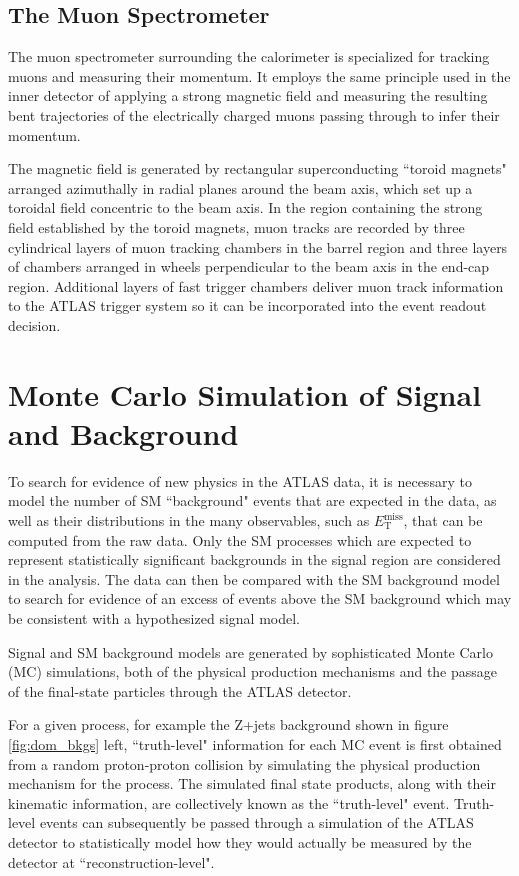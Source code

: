 \documentclass[12pt]{article}
\newcommand*{\met}{\ensuremath{E_\text{T}^\text{miss}}}
\begin{document}
\subsection{The Muon Spectrometer}

The muon spectrometer \cite{atlas} surrounding the calorimeter is specialized for tracking muons and measuring their momentum. It employs the same principle used in the inner detector of applying a strong magnetic field and measuring the resulting bent trajectories of the electrically charged muons passing through to infer their momentum. 

The magnetic field is generated by rectangular superconducting ``toroid magnets" arranged azimuthally in radial planes around the beam axis, which set up a toroidal field concentric to the beam axis. In the region containing the strong field established by the toroid magnets, muon tracks are recorded by three cylindrical layers of muon tracking chambers in the barrel region and three layers of chambers arranged in wheels perpendicular to the beam axis in the end-cap region. Additional layers of fast trigger chambers deliver muon track information to the ATLAS trigger system so it can be incorporated into the event readout decision. 

\newpage

\section{Monte Carlo Simulation of Signal and Background}

To search for evidence of new physics in the ATLAS data, it is necessary to model the number of SM ``background" events that are expected in the data, as well as their distributions in the many observables, such as \met, that can be computed from the raw data. Only the SM processes which are expected to represent statistically significant backgrounds in the signal region are considered in the analysis. The data can then be compared with the SM background model to search for evidence of an excess of events above the SM background which may be consistent with a hypothesized signal model.

Signal and SM background models are generated by sophisticated Monte Carlo (MC) simulations, both of the physical production mechanisms and the passage of the final-state particles through the ATLAS detector. 

For a given process, for example the Z+jets background shown in figure \ref{fig:dom_bkgs} left, ``truth-level" information for each MC event is first obtained from a random proton-proton collision by simulating the physical production mechanism for the process. The simulated final state products, along with their kinematic information, are collectively known as the ``truth-level" event. Truth-level events can subsequently be passed through a simulation of the ATLAS detector to statistically model how they would actually be measured by the detector at ``reconstruction-level". 
\end{document}
